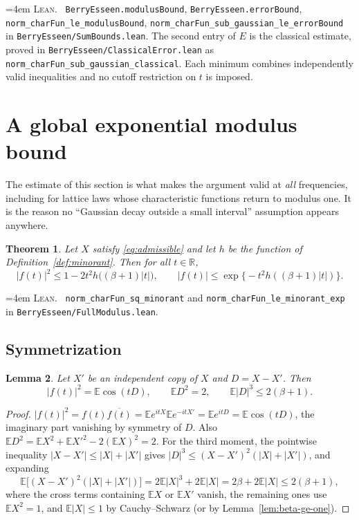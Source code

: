 \documentclass[10pt,a4paper]{article}
\theoremstyle{plain}
\newtheorem{theorem}{Theorem}[section]
\newtheorem{lemma}[theorem]{Lemma}
\theoremstyle{definition}
\newcommand{\R}{\mathbb{R}}
\newcommand{\E}{\mathbb{E}}
\newcommand{\lean}[1]{\texttt{#1}}
\newcommand{\file}[1]{\texttt{#1}}
\newenvironment{leanref}%
  {\par\addvspace{3pt}\begingroup\sloppy\emergencystretch=4em
   \noindent\footnotesize\textsc{Lean.}\ \ignorespaces}%
  {\par\endgroup\addvspace{3pt}}
\begin{document}
\begin{leanref}
\lean{BerryEsseen.modulusBound}, \lean{BerryEsseen.errorBound},
\lean{norm\_charFun\_le\_modulusBound},
\lean{norm\_charFun\_sub\_gaussian\_le\_errorBound} in
\file{BerryEsseen/SumBounds.lean}. The second entry of $E$ is the classical
estimate, proved in \file{BerryEsseen/ClassicalError.lean} as
\lean{norm\_charFun\_sub\_gaussian\_classical}. Each minimum combines
independently valid inequalities and no cutoff restriction on $t$ is imposed.
\end{leanref}

\section{A global exponential modulus bound}
\label{sec:modulus}

The estimate of this section is what makes the argument valid at \emph{all}
frequencies, including for lattice laws whose characteristic functions return
to modulus one. It is the reason no ``Gaussian decay outside a small interval''
assumption appears anywhere.

\begin{theorem}\label{thm:modulus}
Let $X$ satisfy \eqref{eq:admissible} and let $h$ be the function of
Definition~\ref{def:minorant}. Then for all $t\in\R$,
\[
  \boxed{\ |f(t)|^2 \le 1-2t^2h\bigl((\beta+1)|t|\bigr),
  \qquad
  |f(t)| \le \exp\bigl\{-t^2h((\beta+1)|t|)\bigr\}.\ }
\]
\end{theorem}

\begin{leanref}
\lean{norm\_charFun\_sq\_minorant} and \lean{norm\_charFun\_le\_minorant\_exp}
in \file{BerryEsseen/FullModulus.lean}.
\end{leanref}

\subsection{Symmetrization}

\begin{lemma}\label{lem:symm}
Let $X'$ be an independent copy of $X$ and $D=X-X'$. Then
\[
  |f(t)|^2 = \E\cos(tD), \qquad \E D^2 = 2, \qquad
  \E|D|^3 \le 2(\beta+1) .
\]
\end{lemma}

\begin{proof}
$|f(t)|^2=f(t)\overline{f(t)}=\E e^{itX}\E e^{-itX'}=\E e^{itD}=\E\cos(tD)$,
the imaginary part vanishing by symmetry of $D$. Also
$\E D^2=\E X^2+\E X'^2-2(\E X)^2=2$. For the third moment, the pointwise
inequality $|X-X'|\le|X|+|X'|$ gives
$|D|^3\le(X-X')^2(|X|+|X'|)$, and expanding
\[
  \E\bigl[(X-X')^2(|X|+|X'|)\bigr]
  = 2\E|X|^3 + 2\E|X| = 2\beta + 2\E|X| \le 2(\beta+1),
\]
where the cross terms containing $\E X$ or $\E X'$ vanish, the remaining ones
use $\E X^2=1$, and $\E|X|\le1$ by Cauchy--Schwarz (or by
Lemma~\ref{lem:beta-ge-one}).
\end{proof}
\end{document}
